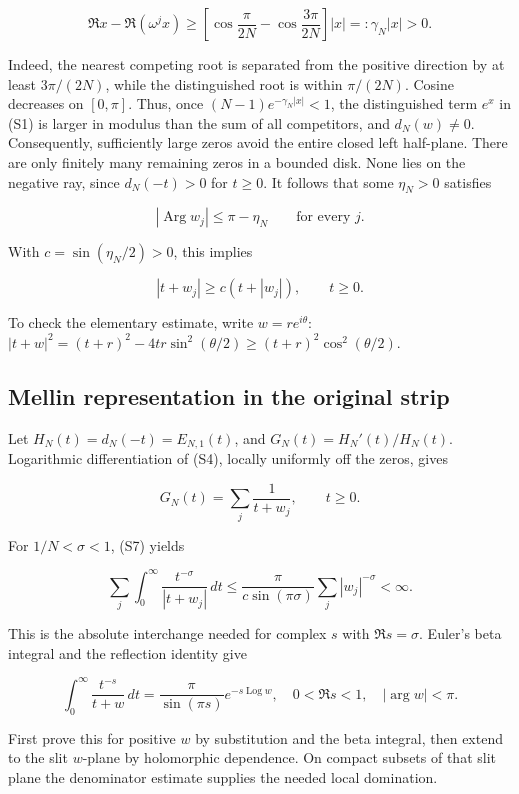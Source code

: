 \[
\Re x-\Re(\omega^j x)
\ge \left[\cos\frac{\pi}{2N}-\cos\frac{3\pi}{2N}\right]|x|
=:\gamma_N|x|>0.
\tag{S5}
\]

Indeed, the nearest competing root is separated from the positive
direction by at least \(3\pi/(2N)\), while the distinguished root is
within \(\pi/(2N)\). Cosine decreases on \([0,\pi]\). Thus, once
\((N-1)e^{-\gamma_N|x|}<1\), the distinguished term \(e^x\) in (S1) is
larger in modulus than the sum of all competitors, and \(d_N(w)\ne0\).
Consequently, sufficiently large zeros avoid the entire closed left
half-plane. There are only finitely many remaining zeros in a bounded
disk. None lies on the negative ray, since \(d_N(-t)>0\) for \(t\ge0\).
It follows that some \(\eta_N>0\) satisfies

\[
|\operatorname{Arg}w_j|\le\pi-\eta_N\qquad\text{for every }j.
\tag{S6}
\]

With \(c=\sin(\eta_N/2)>0\), this implies

\[
|t+w_j|\ge c(t+|w_j|),\qquad t\ge0.
\tag{S7}
\]

To check the elementary estimate, write \(w=re^{i\theta}\):
\(|t+w|^2=(t+r)^2-4tr\sin^2(\theta/2)\ge(t+r)^2\cos^2(\theta/2)\).

\hypertarget{mellin-representation-in-the-original-strip}{%
\subsection{Mellin representation in the original
strip}\label{mellin-representation-in-the-original-strip}}

Let \(H_N(t)=d_N(-t)=E_{N,1}(t)\), and \(G_N(t)=H_N'(t)/H_N(t)\).
Logarithmic differentiation of (S4), locally uniformly off the zeros,
gives

\[
G_N(t)=\sum_j\frac1{t+w_j},\qquad t\ge0.
\tag{S8}
\]

For \(1/N<\sigma<1\), (S7) yields

\[
\sum_j\int_0^\infty\frac{t^{-\sigma}}{|t+w_j|}\,dt
\le\frac{\pi}{c\sin(\pi\sigma)}\sum_j|w_j|^{-\sigma}<\infty.
\tag{S9}
\]

This is the absolute interchange needed for complex \(s\) with
\(\Re s=\sigma\). Euler's beta integral and the reflection identity give

\[
\int_0^\infty\frac{t^{-s}}{t+w}\,dt
=\frac{\pi}{\sin(\pi s)}e^{-s\operatorname{Log}w},
\quad 0<\Re s<1,\quad |\arg w|<\pi.
\tag{S10}
\]

First prove this for positive \(w\) by substitution and the beta
integral, then extend to the slit \(w\)-plane by holomorphic dependence.
On compact subsets of that slit plane the denominator estimate supplies
the needed local domination.

